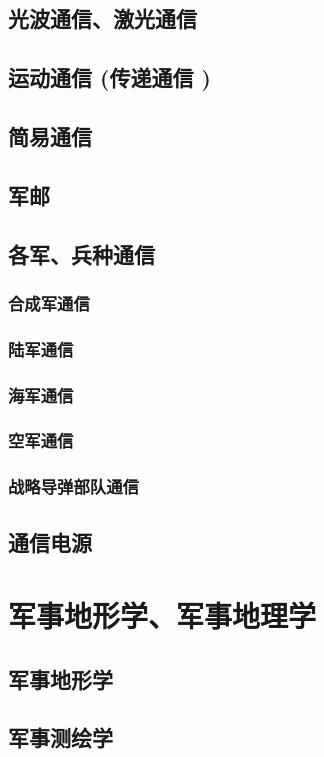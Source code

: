 \documentclass[UTF8]{../ApplicationUniverse}
\begin{document}
    \subsection{光波通信、激光通信}
    \subsection{运动通信 (传递通信 )}
    \subsection{简易通信}
    \subsection{军邮}
    \subsection{各军、兵种通信}
        \subsubsection{合成军通信}
        \subsubsection{陆军通信}
        \subsubsection{海军通信}
        \subsubsection{空军通信}
        \subsubsection{战略导弹部队通信}
    \subsection{通信电源}

\section{军事地形学、军事地理学}
    \subsection{军事地形学}
    \subsection{军事测绘学}
\end{document}
